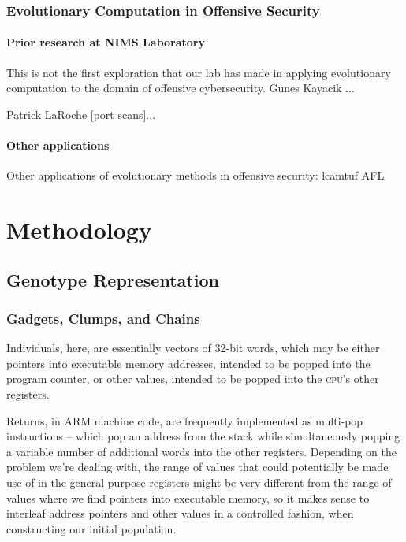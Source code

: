 \subsubsection{Evolutionary Computation in Offensive Security}
\paragraph{Prior research at NIMS Laboratory}
This is not the first exploration that our lab
has made in applying evolutionary computation to the domain of
offensive cybersecurity. Gunes Kayacik ...

Patrick LaRoche [port scans]...

\paragraph{Other applications}
Other applications of evolutionary methods in offensive security:
lcamtuf AFL

\section{Methodology}

\subsection{Genotype Representation}

 
\subsubsection{Gadgets, Clumps, and Chains}

Individuals, here, are essentially vectors of 32-bit words, which
may be either pointers into executable memory addresses, intended
to be popped into the program counter, or other values, intended
to be popped into the \textsc{cpu}'s other registers. 

Returns, in ARM machine code, are frequently implemented as
multi-pop instructions -- which pop an address from the stack
while simultaneously popping a variable number of additional
words into the other registers. Depending on the problem we're
dealing with, the range of values that could potentially be
made use of in the general purpose registers might be very
different from the range of values where we find pointers into
executable memory, so it makes sense to interleaf address
pointers and other values in a controlled fashion, when
constructing our initial population. 

